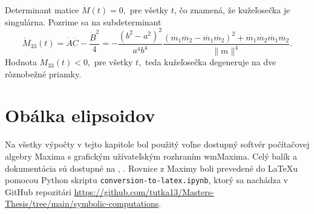Determinant matice $\dot{M}(t) = 0, $ pre všetky $t$, čo znamená, že kužeľosečka je singulárna.
Pozrime sa na subdeterminant
$$
\dot{M}_{33}(t) = \dot{A} \dot{C} - \frac{\dot{B}^2}{4} =  -\frac{(b^2 - a^2)^2}{a^4b^4} \frac{ (\dot{m_1}\ddot{m_2} - \ddot{m_1}\dot{m_2})^2 + \dot{m_1}\dot{m_2}\ddot{m_1}\ddot{m_2}}{\|m\|^4}.
$$ 
Hodnota $\dot{M}_33(t) < 0, $ pre všetky $t,$ teda kužeľosečka degeneruje na dve rôznobežné priamky.

\section{Obálka elipsoidov}

Na všetky výpočty v tejto kapitole bol použitý voľne dostupný softvér počítačovej algebry Maxima s grafickým užívateľským rozhraním wmMaxima. Celý balík a dokumentácia sú dostupné na \cite{MaximaDoc}, \cite{MaximaDownload}. Rovnice z Maximy boli prevedené do \LaTeX u pomocou Python skriptu \verb|conversion-to-latex.ipynb|, ktorý sa nachádza v GitHub repozitári \url{https://github.com/tutka13/Masters-Thesis/tree/main/symbolic-computations}.

